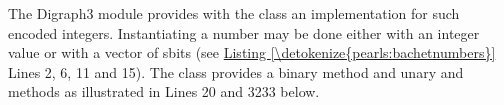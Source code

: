 \documentclass[a4paper,12pt,english]{sphinxhowto}
\begin{document}
\sphinxAtStartPar
The Digraph3  module provides with the  class an implementation for such  encoded integers. Instantiating a  number may be done either with an integer value or with a vector of sbits (see \hyperref[\detokenize{pearls:bachetnumbers}]{Listing \ref{\detokenize{pearls:bachetnumbers}}} Lines  2, 6, 11 and 15). The class provides a binary  method and unary  and  methods as illustrated in Lines 20 and 32\sphinxhyphen{}33 below.
\def\sphinxLiteralBlockLabel{\label{\detokenize{pearls:bachetnumbers}}}
%
\end{document}
